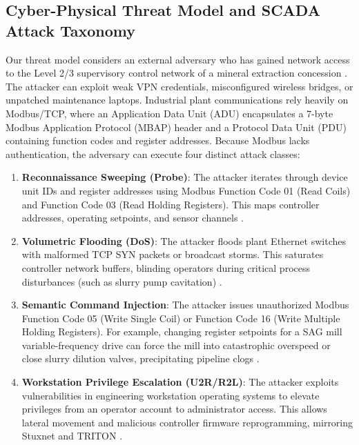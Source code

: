 \documentclass[conference]{IEEEtran}
\begin{document}
\subsection{Cyber-Physical Threat Model and SCADA Attack Taxonomy}
Our threat model considers an external adversary who has gained network access to the Level 2/3 supervisory control network of a mineral extraction concession \cite{hock2022cyber, butko2022cyber}. The attacker can exploit weak VPN credentials, misconfigured wireless bridges, or unpatched maintenance laptops. Industrial plant communications rely heavily on Modbus/TCP, where an Application Data Unit (ADU) encapsulates a 7-byte Modbus Application Protocol (MBAP) header and a Protocol Data Unit (PDU) containing function codes and register addresses. Because Modbus lacks authentication, the adversary can execute four distinct attack classes:
\begin{enumerate}
    \item \textbf{Reconnaissance Sweeping (Probe)}: The attacker iterates through device unit IDs and register addresses using Modbus Function Code 01 (Read Coils) and Function Code 03 (Read Holding Registers). This maps controller addresses, operating setpoints, and sensor channels \cite{hsu2017modbus, cardenas2011attacks}.
    \item \textbf{Volumetric Flooding (DoS)}: The attacker floods plant Ethernet switches with malformed TCP SYN packets or broadcast storms. This saturates controller network buffers, blinding operators during critical process disturbances (such as slurry pump cavitation) \cite{amin2013cyber, lin2018cyber}.
    \item \textbf{Semantic Command Injection}: The attacker issues unauthorized Modbus Function Code 05 (Write Single Coil) or Function Code 16 (Write Multiple Holding Registers). For example, changing register setpoints for a SAG mill variable-frequency drive can force the mill into catastrophic overspeed or close slurry dilution valves, precipitating pipeline clogs \cite{alanazi2022scada, zhou2020deep}.
    \item \textbf{Workstation Privilege Escalation (U2R/R2L)}: The attacker exploits vulnerabilities in engineering workstation operating systems to elevate privileges from an operator account to administrator access. This allows lateral movement and malicious controller firmware reprogramming, mirroring Stuxnet \cite{langner2011stuxnet, falliere2011w32} and TRITON \cite{dipinto2018triton}.
\end{enumerate}
\end{document}
